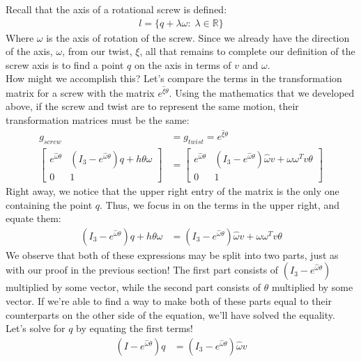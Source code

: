\documentclass[oneside]{book}
\begin{document}
Recall that the axis of a rotational screw is defined:
\begin{align}
    l = \{ q + \lambda \omega: \; \lambda \in \mathbb{R} \}
\end{align}
Where $\omega$ is the axis of rotation of the screw. Since we already have the direction of the axis, $\omega$, from our twist, $\xi$, all that remains to complete our definition of the screw axis is to find a point $q$ on the axis in terms of $v$ and $\omega$.\\
How might we accomplish this? Let's compare the terms in the transformation matrix for a screw with the matrix $e^{\hat\xi\theta}$. Using the mathematics that we developed above, if the screw and twist are to represent the same motion, their transformation matrices must be the same:
\begin{align}
    g_{screw} &= g_{twist} = e^{\hat\xi\theta}\\
    \begin{bmatrix}
    e^{\hat\omega\theta} & (I_3 -e^{\hat\omega\theta})q + h\theta\omega \\
    0 & 1
    \end{bmatrix}
    &= 
    \begin{bmatrix}
    e^{\hat\omega\theta} & (I_3 - e^{\hat\omega\theta})\hat\omega v + \omega \omega ^T v\theta\\
    0 & 1
    \end{bmatrix}
\end{align}
Right away, we notice that the upper right entry of the matrix is the only one containing the point $q$. Thus, we focus in on the terms in the upper right, and equate them:
\begin{align}
    (I_3 -e^{\hat\omega\theta})q + h\theta\omega &= (I_3 - e^{\hat\omega\theta})\hat\omega v + \omega \omega ^T v\theta
\end{align}
We observe that both of these expressions may be split into two parts, just as with our proof in the previous section! The first part consists of $(I_3 - e^{\hat\omega\theta})$ multiplied by some vector, while the second part consists of $\theta$ multiplied by some vector. If we're able to find a way to make both of these parts equal to their counterparts on the other side of the equation, we'll have solved the equality.\\
Let's solve for $q$ by equating the first terms!
\begin{align}
    (I - e^{\hat\omega\theta})q &= (I_3 - e^{\hat\omega\theta})\hat\omega v
\end{align}
\end{document}
